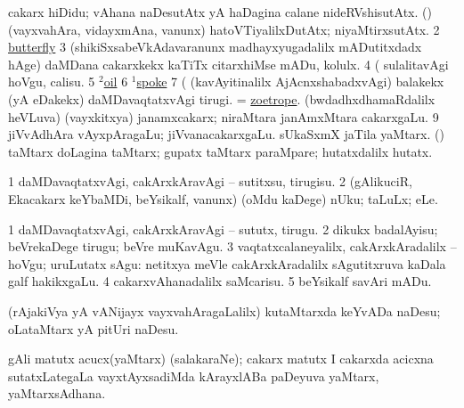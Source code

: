 \noindent 
\gl{\pagu}
\expl{}
\bmng
\bnum
{}  
\banum
{} cakarx hiDidu; vAhana naDesutAtx yA haDagina calane nideRVshisutAtx. 
 (\rUpa) (vayxvahAra, vidayxmAna, \mo vanunx) hatoVTiyalilxDutAtx; niyaMtirxsutAtx. 
\eanum
\numie
\num{2}  \hyperref{kandict_b.pdf}{B}{butterfly nuga}{butterfly}  
\num{3}  (shikiSxsabeVkAdavaranunx madhayxyugadalilx mADutitxdadx hAge) daMDana cakarxkekx kaTiTx citarxhiMse mADu, kolulx. 
\num{4}  (  sulalitavAgi hoVgu, calisu. 
\num{5} \hyperref{kandict_o.pdf}{O}{oil(2) pagu(3)}{$^2$oil}  
\num{6}  \hyperref{kandict_s.pdf}{S}{spoke(1) pagu}{$^1$spoke}  
\num{7}  (  (kavAyitinalilx AjAcnxshabadxvAgi) balakekx (yA eDakekx) daMDavaqtatxvAgi tirugi. 
  
\banum
{} = \hyperref{kandict_z.pdf}{Z}{zoetrope}{zoetrope}. 
 (bwdadhxdhamaRdalilx heVLuva) (vayxkitxya) janamxcakarx; niraMtara janAmxMtara cakarxgaLu. 
\eanum
\numie
\num{9}  jiVvAdhAra vAyxpAragaLu; jiVvanacakarxgaLu. 
\hypertarget{wheel(1) pagu(10)}{} 
  
\banum
{} sUkaSxmX jaTila yaMtarx. 
 (\AmA) taMtarx doLagina taMtarx; gupatx taMtarx paraMpare; hutatxdalilx hutatx. 
\eanum
\numie
\enum
\emng
\eentry

\bentry
{}
\gl{\sakirx}
\expl{}
\bmng
\bnum
\num{1} daMDavaqtatxvAgi, cakArxkAravAgi -- sutitxsu, tirugisu. 
\num{2} (gAlikuciR, Ekacakarx keYbaMDi, beYsikalf, \mo vanunx) (oMdu kaDege) nUku; taLuLx; eLe. 
\enum
\emng

\noindent 
\gl{\akirx}
\expl{}
\bmng
\bnum
\num{1} daMDavaqtatxvAgi, cakArxkAravAgi -- sututx, tirugu. 
\num{2} dikukx badalAyisu; beVrekaDege tirugu; beVre muKavAgu. 
\num{3} vaqtatxcalaneyalilx, cakArxkAradalilx -- hoVgu; uruLutatx sAgu:  netitxya meVle cakArxkAradalilx sAgutitxruva kaDala galf hakikxgaLu. 
\num{4} cakarxvAhanadalilx saMcarisu. 
\num{5} beYsikalf savAri mADu. 
\enum
\emng
\eentry

\bentry 
{} 
\gl{\sakirx}
\expl{}
\bmng
(rAjakiVya yA vANijayx vayxvahAragaLalilx) kutaMtarxda keYvADa naDesu; oLataMtarx yA pitUri naDesu. 
\emng
\eentry

\bentry
{} 
\gl{\nA}
\expl{}
\bmng
gAli matutx acucx(yaMtarx) (salakaraNe); cakarx matutx I cakarxda acicxna sutatxLategaLa vayxtAyxsadiMda kArayxlABa paDeyuva yaMtarx, yaMtarxsAdhana. 
\emng
\eentry

